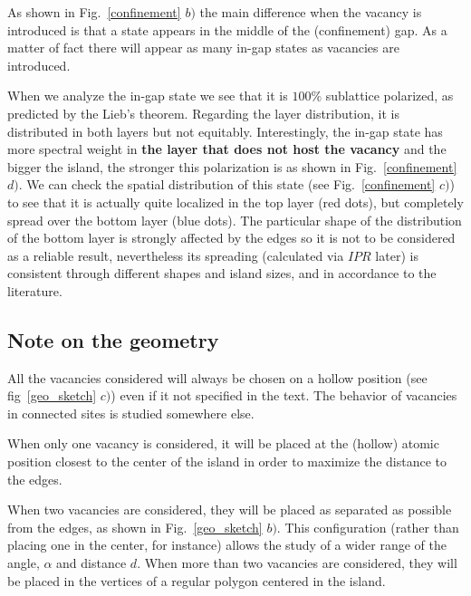 As shown in Fig.~\ref{confinement} $b)$ the main difference when the vacancy is introduced is that a state appears in the middle of the (confinement) gap. As a matter of fact there will appear as many in-gap states as vacancies are introduced.

When we analyze the in-gap state we see that it is $100\%$ sublattice polarized, as predicted by the Lieb's theorem\cite{Lieb1989}. Regarding the layer distribution, it is distributed in both layers but not equitably. Interestingly, the in-gap state has more spectral weight in \textbf{the layer that does not host the vacancy} and the bigger the island, the stronger this polarization is as shown in Fig.~\ref{confinement} $d)$.
We can check the spatial distribution of this state (see Fig.~\ref{confinement} $c)$) to see that it is actually quite localized in the top layer (red dots), but completely spread over the bottom layer (blue dots). The particular shape of the distribution of the bottom layer is strongly affected by the edges so it is not to be considered as a reliable result, nevertheless its spreading (calculated via $IPR$ later) is consistent through different shapes and island sizes, and in accordance to the literature\cite{Castro2010}.


\subsection{Note on the geometry}
All the vacancies considered will always be chosen on a hollow position (see fig~\ref{geo_sketch} $c)$) even if it not specified in the text. The behavior of vacancies in connected sites is studied somewhere else\cite{Castro2010}.

When only one vacancy is considered, it will be placed at the (hollow) atomic position closest to the center of the island in order to maximize the distance to the edges.

When two vacancies are considered, they will be placed as separated as possible from the edges, as shown in Fig.~\ref{geo_sketch} $b)$. This configuration (rather than placing one in the center, for instance) allows the study of a wider range of the angle, $\alpha$ and distance $d$.
When more than two vacancies are considered, they will be placed in the vertices of a regular polygon centered in the island.


